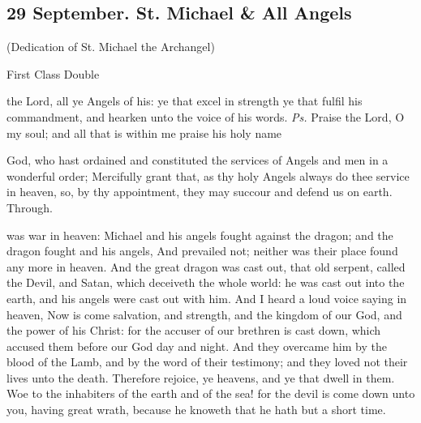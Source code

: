 \clearpage
\subsection{29 September. St. Michael \& All Angels}

\centerline{\small{(Dedication of St. Michael the Archangel)}}

\begin{inhead}
	First Class Double
\end{inhead}


\introit
{} the Lord, all ye Angels of his: ye that excel in strength ye that fulfil his commandment, and hearken unto the voice of his words. \textit{Ps.} Praise the Lord, O my soul; and all that is within me praise his holy name

\collect
{} God, who hast ordained and constituted the services of Angels and men in a wonderful order; Mercifully grant that, as thy holy Angels always do thee service in heaven, so, by thy appointment, they may succour and defend us on earth. Through.

 was war in heaven: Michael and his angels fought against the dragon; and the dragon fought and his angels, And prevailed not; neither was their place found any more in heaven. And the great dragon was cast out, that old serpent, called the Devil, and Satan, which deceiveth the whole world: he was cast out into the earth, and his angels were cast out with him. And I heard a loud voice saying in heaven, Now is come salvation, and strength, and the kingdom of our God, and the power of his Christ: for the accuser of our brethren is cast down, which accused them before our God day and night. And they overcame him by the blood of the Lamb, and by the word of their testimony; and they loved not their lives unto the death. Therefore rejoice, ye heavens, and ye that dwell in them. Woe to the inhabiters of the earth and of the sea! for the devil is come down unto you, having great wrath, because he knoweth that he hath but a short time.


